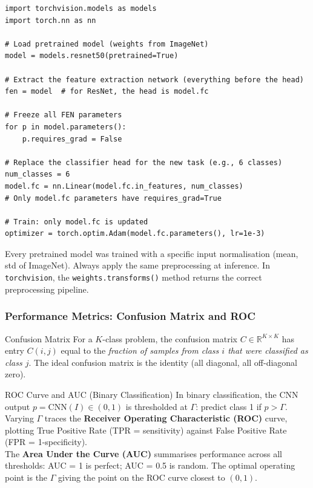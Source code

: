 \documentclass[11pt,a4paper]{article}
\newcommand{\term}[1]{\textcolor{DefGreen}{\textbf{#1}}\index{#1}}
\begin{document}
\begin{lstlisting}[caption={Transfer learning with a pretrained model in PyTorch}]
import torchvision.models as models
import torch.nn as nn

# Load pretrained model (weights from ImageNet)
model = models.resnet50(pretrained=True)

# Extract the feature extraction network (everything before the head)
fen = model  # for ResNet, the head is model.fc

# Freeze all FEN parameters
for p in model.parameters():
    p.requires_grad = False

# Replace the classifier head for the new task (e.g., 6 classes)
num_classes = 6
model.fc = nn.Linear(model.fc.in_features, num_classes)
# Only model.fc parameters have requires_grad=True

# Train: only model.fc is updated
optimizer = torch.optim.Adam(model.fc.parameters(), lr=1e-3)
\end{lstlisting}

\begin{warnbox}
Every pretrained model was trained with a specific input normalisation (mean, std of ImageNet). Always apply the same preprocessing at inference. In \texttt{torchvision}, the \texttt{weights.transforms()} method returns the correct preprocessing pipeline.
\end{warnbox}

\subsubsection{Performance Metrics: Confusion Matrix and ROC}

\begin{defbox}{Confusion Matrix}
For a $K$-class problem, the confusion matrix $C \in \mathbb{R}^{K\times K}$ has entry $C(i,j)$ equal to the \emph{fraction of samples from class $i$ that were classified as class $j$}. The ideal confusion matrix is the identity (all diagonal, all off-diagonal zero).
\end{defbox}

\begin{defbox}{ROC Curve and AUC (Binary Classification)}
In binary classification, the CNN output $p = \mathrm{CNN}(I) \in (0,1)$ is thresholded at $\Gamma$: predict class 1 if $p > \Gamma$. Varying $\Gamma$ traces the \term{Receiver Operating Characteristic (ROC)} curve, plotting True Positive Rate (TPR = sensitivity) against False Positive Rate (FPR = 1-specificity).\\
The \textbf{Area Under the Curve (AUC)} summarises performance across all thresholds: AUC = 1 is perfect; AUC = 0.5 is random. The optimal operating point is the $\Gamma$ giving the point on the ROC curve closest to $(0,1)$.
\end{defbox}
\end{document}
